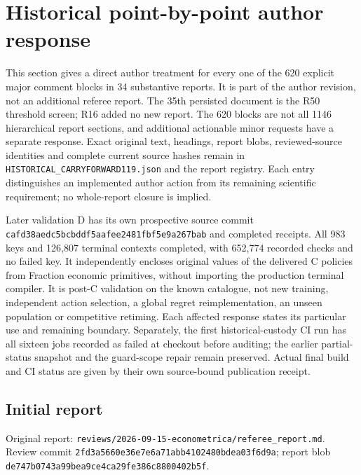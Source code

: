 

\section{Historical point-by-point author response}\label{dev:allreferee119}

This section gives a direct author treatment for every one of the 620 explicit major comment blocks in 34 substantive reports. It is part of the author revision, not an additional referee report. The 35th persisted document is the R50 threshold screen; R16 added no new report. The 620 blocks are not all 1146 hierarchical report sections, and additional actionable minor requests have a separate response. Exact original text, headings, report blobs, reviewed-source identities and complete current source hashes remain in \nolinkurl{HISTORICAL_CARRYFORWARD119.json} and the report registry. Each entry distinguishes an implemented author action from its remaining scientific requirement; no whole-report closure is implied.

\begingroup\small

Later validation D has its own prospective source commit \nolinkurl{cafd38aedc5bcbddf5aafee2481fbf5e9a267bab} and completed receipts. All 983 keys and 126,807 terminal contexts completed, with 652,774 recorded checks and no failed key. It independently encloses original values of the delivered C policies from Fraction economic primitives, without importing the production terminal compiler. It is post-C validation on the known catalogue, not new training, independent action selection, a global regret reimplementation, an unseen population or competitive retiming. Each affected response states its particular use and remaining boundary. Separately, the first historical-custody CI run has all sixteen jobs recorded as failed at checkout before auditing; the earlier partial-status snapshot and the guard-scope repair remain preserved. Actual final build and CI status are given by their own source-bound publication receipt.

\subsection{Initial report}

Original report: \nolinkurl{reviews/2026-09-15-econometrica/referee_report.md}. Review commit \nolinkurl{2fd3a5660e36e7e6a71abb4102480bdea03f6d9a}; report blob \nolinkurl{de747b0743a99bea9ce4ca29fe386c8800402b5f}.

